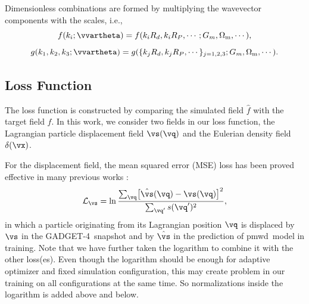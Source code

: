 \documentclass[modern, trackchanges, dvipsnames]{aastex631}
\newcommand{\pmwd}{{\usefont{T1}{nova}{m}{sl}pmwd}}
\newcommand{\GADGET}{{{\fontsize{10pt}{12pt}\selectfont GADGET}-4}}
\newcommand{\cL}{\mathcal{L}}
\newcommand{\Omegam}{\Omega_\mathrm{m}}
\begin{document}
Dimensionless combinations are formed by multiplying the wavevector
components with the scales, i.e.,
%
\begin{equation}
f(k_i; \vvartheta) = f(k_iR_d, k_iR_P, \cdots; G_m, \Omegam, \cdots),
\end{equation}
%
\begin{equation}
g(k_1, k_2, k_3; \vvartheta) = g(\{k_jR_d, k_jR_P, \cdots\}_{j=1,2,3};
                                 G_m, \Omegam, \cdots).
\end{equation}
%


\vspace{1em}
\subsection{Loss Function}
\label{sec:loss}

The loss function is constructed by comparing the simulated field $\hat
f$ with the target field $f$.
In this work, we consider two fields in our loss function, the
Lagrangian particle displacement field $\vs(\vq)$ and the Eulerian
density field $\delta(\vx)$.

For the displacement field, the mean squared error (MSE) loss has been
proved effective in many previous works
\citep[e.g.,][]{HeEtAl2019, LiEtAl2021}:
%
\begin{equation}
\cL_\vs = \ln \frac{\sum_\vq \bigl[ \hat\vs(\vq) - \vs(\vq) \bigr]^2}
                   {\sum_{\vq'} s(\vq')^2},
\end{equation}
%
in which a particle originating from its Lagrangian position $\vq$ is
displaced by $\vs$ in the \GADGET\ snapshot and by $\hat\vs$ in the
prediction of \pmwd\ model in training.
Note that we have further taken the logarithm to combine it with the
other loss(es).
Even though the logarithm should be enough for adaptive optimizer and
fixed simulation configuration, this may create problem in our training
on all configurations at the same time.
So normalizations inside the logarithm is added above and below.
\end{document}
